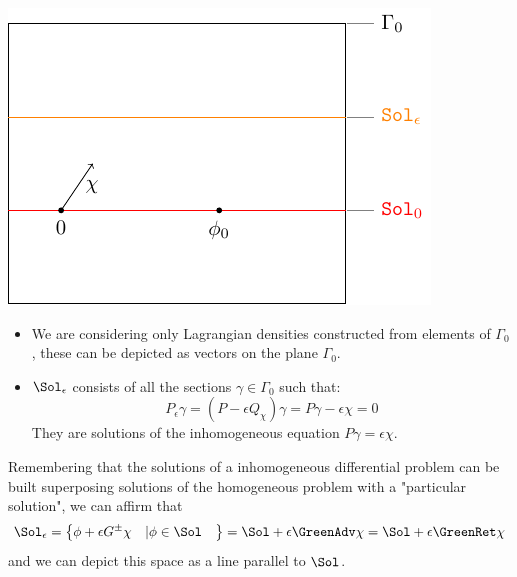 \documentclass[Main]{subfiles}
\begin{document}
		\vspace{1mm}		
		\begin{minipage}{0.5\textwidth}
			\includegraphics[width=\textwidth]{Pictures/compsupp_GeometricPicture1}
		\end{minipage}
		\begin{minipage}{0.5\textwidth}
			\begin{itemize}
				\item  We are considering only Lagrangian densities constructed from elements of $\Gamma_0$, these can be depicted as vectors on the plane $\Gamma_0$.
				\item 	$\Sol_\epsilon$ consists of all the sections $\gamma \in \Gamma_0$ such that:
					\begin{displaymath}
						P_\epsilon \gamma = ( P  - \epsilon Q_\chi) \gamma = P \gamma - \epsilon \chi = 0
					\end{displaymath}
					They are solutions of the inhomogeneous equation $P \gamma = \epsilon \chi$.
			\end{itemize}
		\end{minipage}
		\vspace{1mm}
		
		Remembering that the solutions of a inhomogeneous differential problem can be built superposing solutions of the homogeneous problem with a "particular solution", 
		we can affirm that
		\begin{displaymath}
			\Sol_\epsilon = \left\lbrace \phi + \epsilon G^\pm \chi \quad \vert \phi \in \Sol \quad  \right\rbrace =
			 \Sol + \epsilon \GreenAdv \chi = \Sol + \epsilon \GreenRet \chi
		\end{displaymath}
		and we can depict this space as a line parallel to $\Sol$.
\end{document}
